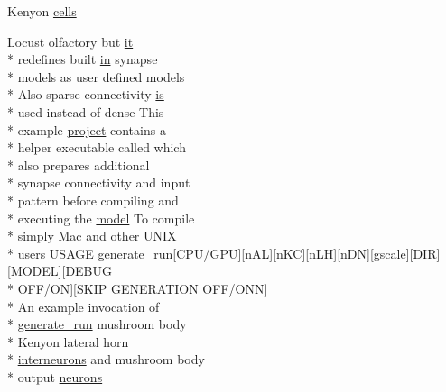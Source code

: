 \begin{DoxyCompactItemize}
Kenyon \hyperlink{userproject_2MBody__userdef__project_2README_8txt_a62f5f9ffc3409d8f12e8b58fdd5ac824}{cells}
\item 
Locust olfactory but \hyperlink{userproject_2PoissonIzh__project_2README_8txt_a3e3bbb6c9b14c38757cf273a117e43e8}{it} \\*
redefines built \hyperlink{README_8txt_a148897a6b2cc9cff25af80abb13426b0}{in} synapse \\*
models as user defined models \\*
Also sparse connectivity \hyperlink{userproject_2MBody__userdef__project_2README_8txt_a7b4e6cf78d14ce882cb8ff127e01babd}{is} \\*
used instead of dense This \\*
example \hyperlink{userproject_2SynDelay__project_2README_8txt_a762c750134e07a31b7965860fd292b51}{project} contains a \\*
helper executable called which \\*
also prepares additional \\*
synapse connectivity and input \\*
pattern before compiling and \\*
executing the \hyperlink{README_8txt_a69fd801b7213948c12d9dd7eebb3ed14}{model} To compile \\*
simply Mac and other U\+N\+I\+X \\*
users U\+S\+A\+G\+E \hyperlink{userproject_2MBody__userdef__project_2README_8txt_a320a215d1e27b4de394be70e90d22863}{generate\+\_\+run}\mbox{[}\hyperlink{README_8txt_a74a069e3c75797de2636c4dd14daa147}{C\+P\+U}/\hyperlink{modelSpec_8h_a39cb9803524b6f3b783344b2f89867b4}{G\+P\+U}\mbox{]}\mbox{[}n\+A\+L\mbox{]}\mbox{[}n\+K\+C\mbox{]}\mbox{[}n\+L\+H\mbox{]}\mbox{[}n\+D\+N\mbox{]}\mbox{[}gscale\mbox{]}\mbox{[}D\+I\+R\mbox{]}\mbox{[}M\+O\+D\+E\+L\mbox{]}\mbox{[}D\+E\+B\+U\+G \\*
O\+F\+F/O\+N\mbox{]}\mbox{[}S\+K\+I\+P G\+E\+N\+E\+R\+A\+T\+I\+O\+N O\+F\+F/O\+N\+N\mbox{]} \\*
An example invocation of \\*
\hyperlink{userproject_2MBody__userdef__project_2README_8txt_a320a215d1e27b4de394be70e90d22863}{generate\+\_\+run} mushroom body \\*
Kenyon lateral horn \\*
\hyperlink{userproject_2SynDelay__project_2README_8txt_adf6327d22e2c11a62a22ab5afd4f2b81}{interneurons} and mushroom body \\*
output \hyperlink{userproject_2MBody__userdef__project_2README_8txt_a40eee27bfd7f70218d52a0b2bafccba2}{neurons}

\end{DoxyCompactItemize}
